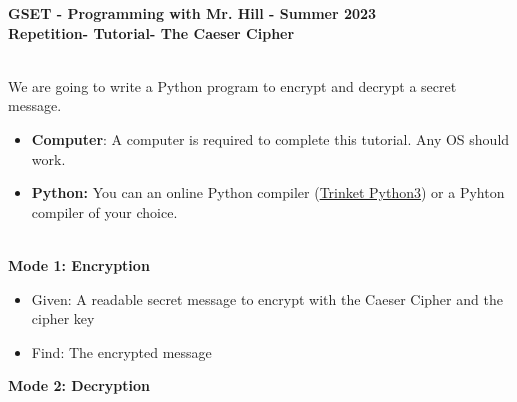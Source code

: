 \documentclass[12pt]{article}
\newcommand{\MNUM}{7} %
\newcommand{\MNAME}{Repetition} %
\newcommand{\TNAME}{The Caeser Cipher} %
\begin{document}
\thispagestyle{plain}

\begin{center}
   {\bf \large GSET - Programming with Mr. Hill - Summer 2023} \vspace{5mm}\\
   {\bf \Large \MNAME \hspc -  Tutorial\hspc\MNUM\hspc - \TNAME}\vspace{3mm}\\
   
\end{center}


\begin{description}[labelindent=1cm]
	
	\item[\textbf{\underline{Overview:}}] \hfill \vspace{3mm}\\
	We are going to write a Python program to encrypt and decrypt a secret message. 
	
	\item[\textbf{\underline{System Requirements:}}] \hfill \vspace{0mm}

\begin{itemize}
	\item {\bf Computer}: A computer is required to complete this tutorial. Any OS should work.
	\item {\bf Python:} You can an online Python compiler (\href{https://trinket.io/embed/python3/a5bd54189b}{Trinket Python3}) or a Pyhton compiler of your choice.
\end{itemize}

	\item[\textbf{\underline{Problem Statement:}}] \hfill \vspace{0mm} \\
	{\bf Mode 1: Encryption}
	\begin{itemize}

		\item Given: A readable secret message to encrypt with the Caeser Cipher and the cipher key
		
		\item Find: The encrypted message
		 
	\end{itemize}

	{\bf Mode 2: Decryption}
	\begin{itemize}
		

\end{itemize}
\end{description}
\end{document}

